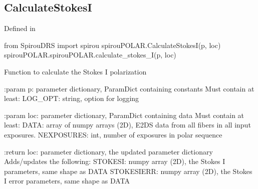 
\noindent\begin{minipage}{\textwidth}
\subsection{CalculateStokesI}

Defined in \spirouPOLAR{}

\begin{pythonbox}
from SpirouDRS import spirou
spirouPOLAR.CalculateStokesI(p, loc)
spirouPOLAR.spirouPOLAR.calculate_stokes_I(p, loc)
\end{pythonbox}

\begin{pythondocstring}
Function to calculate the Stokes I polarization

:param p: parameter dictionary, ParamDict containing constants
    Must contain at least:
        LOG_OPT: string, option for logging
    
:param loc: parameter dictionary, ParamDict containing data
    Must contain at least:
        DATA: array of numpy arrays (2D), E2DS data from all fibers in
              all input exposures.
        NEXPOSURES: int, number of exposures in polar sequence
    
:return loc: parameter dictionary, the updated parameter dictionary
    Adds/updates the following:
        STOKESI: numpy array (2D), the Stokes I parameters, same shape as
                 DATA
        STOKESIERR: numpy array (2D), the Stokes I error parameters, same 
                    shape as DATA
\end{pythondocstring}
\end{minipage}


